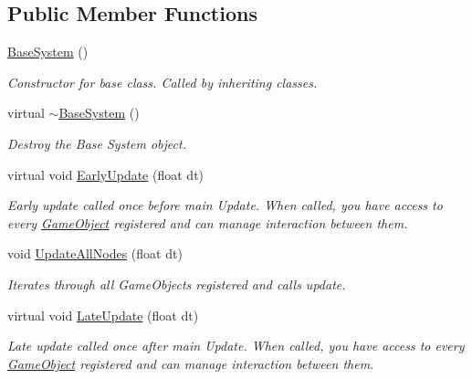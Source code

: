 \subsection*{Public Member Functions}
\begin{DoxyCompactItemize}
\item 
\mbox{\label{classBaseSystem_a77a342bf74a7e875f35ff1c70dd8c310}} 
\hyperlink{classBaseSystem_a77a342bf74a7e875f35ff1c70dd8c310}{Base\+System} ()
\begin{DoxyCompactList}\small\item\em Constructor for base class. Called by inheriting classes. \end{DoxyCompactList}\item 
\mbox{\label{classBaseSystem_a581856f116f41009f84ae359aef588b3}} 
virtual \hyperlink{classBaseSystem_a581856f116f41009f84ae359aef588b3}{$\sim$\+Base\+System} ()
\begin{DoxyCompactList}\small\item\em Destroy the Base System object. \end{DoxyCompactList}\item 
virtual void \hyperlink{classBaseSystem_a202ed394e663f970f181d810c86760dc}{Early\+Update} (float dt)
\begin{DoxyCompactList}\small\item\em Early update called once before main Update. When called, you have access to every \hyperlink{classGameObject}{Game\+Object} registered and can manage interaction between them. \end{DoxyCompactList}\item 
void \hyperlink{classBaseSystem_a6422693fc429d74a2b0b4c4e860d1810}{Update\+All\+Nodes} (float dt)
\begin{DoxyCompactList}\small\item\em Iterates through all Game\+Objects registered and calls update. \end{DoxyCompactList}\item 
virtual void \hyperlink{classBaseSystem_ab6520975a6376e59005d3a40456358d4}{Late\+Update} (float dt)
\begin{DoxyCompactList}\small\item\em Late update called once after main Update. When called, you have access to every \hyperlink{classGameObject}{Game\+Object} registered and can manage interaction between them. \end{DoxyCompactList}\item 

\end{DoxyCompactItemize}
